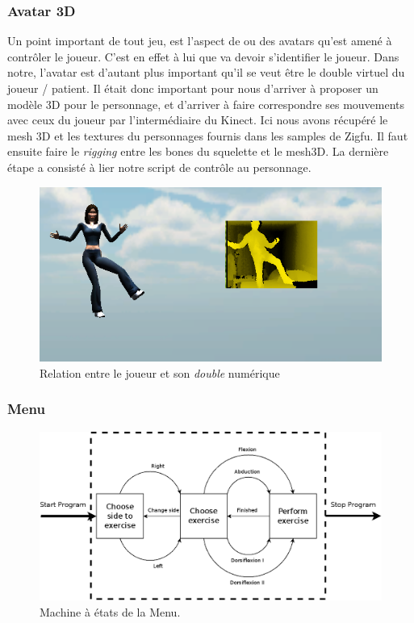 \documentclass[french,12pt]{report}
\begin{document}
		\subsubsection{Avatar 3D}		
Un point important de tout jeu, est l'aspect de ou des avatars qu'est amené à contrôler le joueur. C'est en effet à lui que va devoir s'identifier le joueur. Dans notre, l'avatar est d'autant plus important qu'il se veut être le double virtuel du joueur / patient. Il était donc important pour nous d'arriver à proposer un modèle 3D pour le personnage, et d'arriver à faire correspondre ses mouvements avec ceux du joueur par l'intermédiaire du Kinect. Ici nous avons récupéré le mesh 3D et les textures du personnages fournis dans les samples de Zigfu. Il faut ensuite faire le \textit{rigging} entre les bones du squelette et le mesh3D. La dernière étape a consisté à lier notre script de contrôle au personnage.
\begin{figure}
\begin{center}
	\includegraphics[scale=1]{images/avatar3D.png} \caption{Relation entre le joueur et son \textit{double} numérique}
\end{center}
\end{figure}

    
\subsubsection{Menu}
    
\begin{figure}[h!]
\centering
\includegraphics[width=\linewidth]{images/menu}
\caption{Machine à états de la Menu.}
\end{figure}
    
\end{document}
